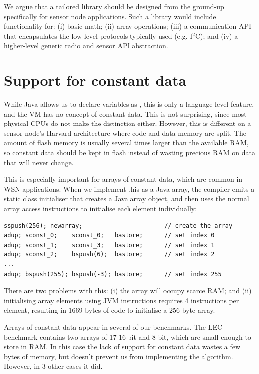 We argue that a tailored library should be designed from the ground-up specifically for sensor node applications. Such a library would include functionality for: (i) basic math; (ii) array operations; (iii) a communication API that encapsulates the low-level protocols typically used (e.g. I$^{2}$C); and (iv) a higher-level generic radio and sensor API abstraction.




\section{Support for constant data}
\label{sec-const-data}
While Java allows us to declare variables as , this is only a language level feature, and the VM has no concept of constant data. This is not surprising, since most physical CPUs do not make the distinction either. However, this is different on a sensor node's Harvard architecture where code and data memory are split. The amount of flash memory is usually several times larger than the available RAM, so constant data should be kept in flash instead of wasting precious RAM on data that will never change.

This is especially important for arrays of constant data, which are common in WSN applications. When we implement this as a  Java array, the compiler emits a static class initialiser that creates a Java array object, and then uses the normal array access instructions to initialise each element individually:

\begin{verbatim}
sspush(256); newarray;                       // create the array
adup; sconst_0;    sconst_0;   bastore;      // set index 0
adup; sconst_1;    sconst_3;   bastore;      // set index 1
adup; sconst_2;    bspush(6);  bastore;      // set index 2
...
adup; bspush(255); bspush(-3); bastore;      // set index 255
\end{verbatim}

There are two problems with this: (i) the array will occupy scarce RAM; and (ii) initialising array elements using JVM instructions requires 4 instructions per element, resulting in 1669 bytes of code to initialise a 256 byte array.

Arrays of constant data appear in several of our benchmarks. The LEC benchmark contains two arrays of 17 16-bit and 8-bit, which are small enough to store in RAM. In this case the lack of support for constant data wastes a few bytes of memory, but doesn't prevent us from implementing the algorithm. However, in 3 other cases it did.

